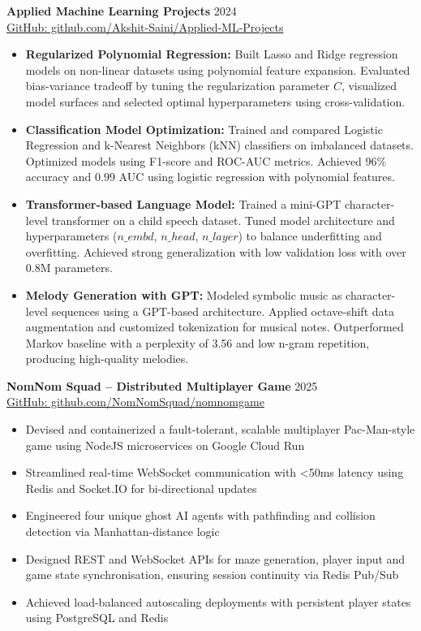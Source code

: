 \documentclass[a4paper,9pt]{article}
\begin{document}
\textbf{Applied Machine Learning Projects} \hfill {2024}\\
 \href{https://github.com/Akshit-Saini/Applied-ML-Projects}{GitHub: github.com/Akshit-Saini/Applied-ML-Projects}
\begin{itemize}[leftmargin=*]
  \item \textbf{Regularized Polynomial Regression:} 
  Built Lasso and Ridge regression models on non-linear datasets using polynomial feature expansion. Evaluated bias-variance tradeoff by tuning the regularization parameter $C$, visualized model surfaces and selected optimal hyperparameters using cross-validation.

  \item \textbf{Classification Model Optimization:} 
  Trained and compared Logistic Regression and k-Nearest Neighbors (kNN) classifiers on imbalanced datasets. Optimized models using F1-score and ROC-AUC metrics. Achieved $96\%$ accuracy and $0.99$ AUC using logistic regression with polynomial features.

  \item \textbf{Transformer-based Language Model:} 
  Trained a mini-GPT character-level transformer on a child speech dataset. Tuned model architecture and hyperparameters ($n\_embd$, $n\_head$, $n\_layer$) to balance underfitting and overfitting. Achieved strong generalization with low validation loss with over 0.8M parameters.

  \item \textbf{Melody Generation with GPT:} 
  Modeled symbolic music as character-level sequences using a GPT-based architecture. Applied octave-shift data augmentation and customized tokenization for musical notes. Outperformed Markov baseline with a perplexity of 3.56 and low n-gram repetition, producing high-quality melodies.
\end{itemize}

\textbf{NomNom Squad – Distributed Multiplayer Game} \hfill 2025  
\\ \href{https://github.com/NomNomSquad/nomnomgame}{GitHub: github.com/NomNomSquad/nomnomgame}
\begin{itemize}[leftmargin=*]
  \item Devised and containerized a fault-tolerant, scalable multiplayer Pac-Man-style game using NodeJS microservices on Google Cloud Run  
  \item Streamlined real-time WebSocket communication with <50ms latency using Redis and Socket.IO for bi-directional updates  
  \item Engineered four unique ghost AI agents with pathfinding and collision detection via Manhattan-distance logic  
  \item Designed REST and WebSocket APIs for maze generation, player input and game state synchronisation, ensuring session continuity via Redis Pub/Sub  
  \item Achieved load-balanced autoscaling deployments with persistent player states using PostgreSQL and Redis
\end{itemize}
\end{document}
